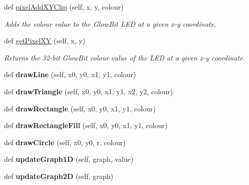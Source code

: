 \begin{DoxyCompactItemize}
def \hyperlink{classglowbit_1_1glowbitMatrix_a4f2deb5f58f45e285e84c9cac1644618}{pixel\+Add\+X\+Y\+Clip} (self, x, y, colour)
\begin{DoxyCompactList}\small\item\em Adds the colour value to the Glow\+Bit L\+ED at a given x-\/y coordinate. \end{DoxyCompactList}\item 
def \hyperlink{classglowbit_1_1glowbitMatrix_ab67885d63f392afa061c8455de3e31ba}{get\+Pixel\+XY} (self, x, y)
\begin{DoxyCompactList}\small\item\em Returns the 32-\/bit Glow\+Bit colour value of the L\+ED at a given x-\/y coordinate. \end{DoxyCompactList}\item 
\mbox{\label{classglowbit_1_1glowbitMatrix_a373a7739051a7399a94636375ac0b4ec}} 
def {\bfseries draw\+Line} (self, x0, y0, x1, y1, colour)
\item 
\mbox{\label{classglowbit_1_1glowbitMatrix_ac0b08486a62b6bd9c8633287d2725f43}} 
def {\bfseries draw\+Triangle} (self, x0, y0, x1, y1, x2, y2, colour)
\item 
\mbox{\label{classglowbit_1_1glowbitMatrix_ad70235a976475054af4ccb534a32b5e7}} 
def {\bfseries draw\+Rectangle} (self, x0, y0, x1, y1, colour)
\item 
\mbox{\label{classglowbit_1_1glowbitMatrix_ad91952585c61527ae5c0ac4a170435bf}} 
def {\bfseries draw\+Rectangle\+Fill} (self, x0, y0, x1, y1, colour)
\item 
\mbox{\label{classglowbit_1_1glowbitMatrix_a4efec5ce17c30403505b1f2775022e90}} 
def {\bfseries draw\+Circle} (self, x0, y0, r, colour)
\item 
\mbox{\label{classglowbit_1_1glowbitMatrix_a0d44976cdc12728d9ae80c2d901029c0}} 
def {\bfseries update\+Graph1D} (self, graph, value)
\item 
\mbox{\label{classglowbit_1_1glowbitMatrix_aaf5d23a0ed51901ffd78dfae985fbc7f}} 
def {\bfseries update\+Graph2D} (self, graph)

\end{DoxyCompactItemize}
